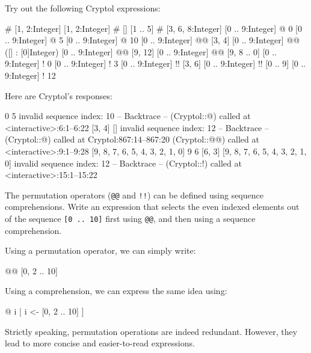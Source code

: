 
\restartrepl
\begin{Exercise}\label{ex:seq:7}
Try out the following Cryptol expressions:
\begin{replinVerb}
  [] # [1, 2:Integer]
  [1, 2:Integer] # []
  [1 .. 5] # [3, 6, 8:Integer]
  [0 .. 9:Integer] @ 0
  [0 .. 9:Integer] @ 5
  [0 .. 9:Integer] @ 10
  [0 .. 9:Integer] @@ [3, 4]
  [0 .. 9:Integer] @@ ([] : [0]Integer)
  [0 .. 9:Integer] @@ [9, 12]
  [0 .. 9:Integer] @@ [9, 8 .. 0]
  [0 .. 9:Integer] ! 0
  [0 .. 9:Integer] ! 3
  [0 .. 9:Integer] !! [3, 6]
  [0 .. 9:Integer] !! [0 .. 9]
  [0 .. 9:Integer] ! 12
\end{replinVerb}
\end{Exercise}
\begin{Answer}
Here are Cryptol's responses:
\begin{reploutVerb}
  [1, 2]
  [1, 2]
  [1, 2, 3, 4, 5, 3, 6, 8]
  0
  5
  invalid sequence index: 10
  -- Backtrace --
  (Cryptol::@) called at <interactive>:6:1--6:22
  [3, 4]
  []
  invalid sequence index: 12
   -- Backtrace --
  (Cryptol::@) called at Cryptol:867:14--867:20
  (Cryptol::@@) called at <interactive>:9:1--9:28
  [9, 8, 7, 6, 5, 4, 3, 2, 1, 0]
  9
  6
  [6, 3]
  [9, 8, 7, 6, 5, 4, 3, 2, 1, 0]
  invalid sequence index: 12
  -- Backtrace --
  (Cryptol::!) called at <interactive>:15:1--15:22
\end{reploutVerb}
\end{Answer}

\restartrepl
\begin{Exercise}\label{ex:seq:8}
  The permutation operators ({\tt @@} and {\tt !!}) can be defined
  using sequence comprehensions.  Write an expression that selects the
  even indexed elements out of the sequence \texttt{[0 ..\ 10]} first
  using {\tt @@}, and then using a sequence comprehension.
\end{Exercise}
\begin{Answer}
Using a permutation operator, we can simply write:
\begin{replinVerb}
  [0 .. 10] @@ [0, 2 .. 10]
\end{replinVerb}
Using a comprehension, we can express the same idea using:
\begin{replinVerb}
  [ [0 .. 10] @ i | i <- [0, 2 .. 10] ]
\end{replinVerb}
Strictly speaking, permutation operations are indeed redundant.
However, they lead to more concise and easier-to-read expressions.
\end{Answer}

